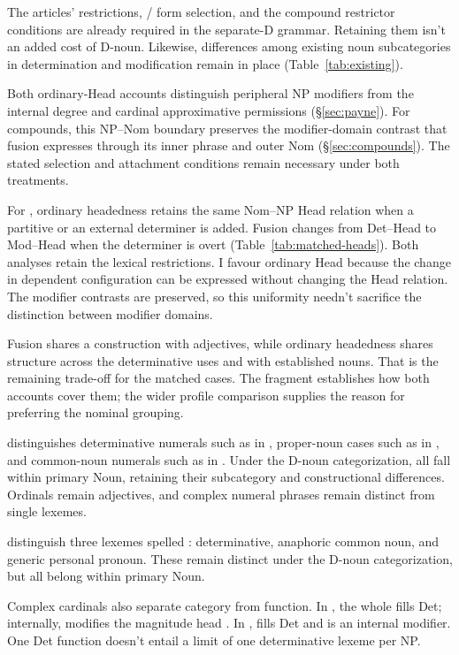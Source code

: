 \documentclass[12pt]{article}
\begin{document}
The articles' restrictions, / form selection, and the compound restrictor conditions are already required in the separate-D grammar. Retaining them isn't an added cost of D-noun. Likewise, differences among existing noun subcategories in determination and modification remain in place (Table~\ref{tab:existing}).

Both ordinary-Head accounts distinguish peripheral NP modifiers from the internal degree and cardinal approximative permissions (§\ref{sec:payne}). For compounds, this NP--Nom boundary preserves the modifier-domain contrast that fusion expresses through its inner phrase and outer Nom (§\ref{sec:compounds}). The stated selection and attachment conditions remain necessary under both treatments.

For , ordinary headedness retains the same Nom--NP Head relation when a partitive or an external determiner is added. Fusion changes from Det--Head to Mod--Head when the determiner is overt (Table~\ref{tab:matched-heads}). Both analyses retain the lexical restrictions. I favour ordinary Head because the change in dependent configuration can be expressed without changing the Head relation. The modifier contrasts are preserved, so this uniformity needn't sacrifice the distinction between modifier domains.

Fusion shares a construction with adjectives, while ordinary headedness shares structure across the determinative uses and with established nouns. That is the remaining trade-off for the matched cases. The fragment establishes how both accounts cover them; the wider profile comparison supplies the reason for preferring the nominal grouping.

\textcite{reynolds2026numerals} distinguishes determinative numerals such as  in , proper-noun cases such as  in , and common-noun numerals such as  in . Under the D-noun categorization, all fall within primary Noun, retaining their subcategory and constructional differences. Ordinals remain adjectives, and complex numeral phrases remain distinct from single lexemes.

\textcite[797--798]{payne2013anaphoric} distinguish three lexemes spelled : determinative, anaphoric common noun, and generic personal pronoun. These remain distinct under the D-noun categorization, but all belong within primary Noun.

Complex cardinals also separate category from function. In , the whole  fills Det; internally,  modifies the magnitude head  \citep[§4]{reynolds2026numerals}. In ,  fills Det and  is an internal modifier. One Det function doesn't entail a limit of one determinative lexeme per NP.
\end{document}

